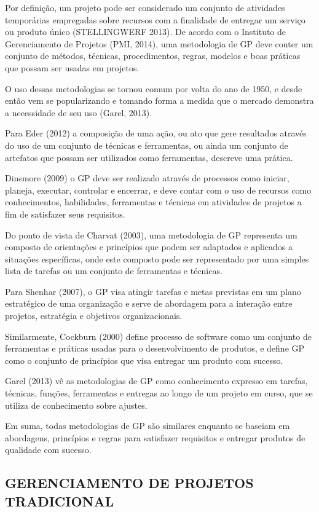 Por definição, um projeto pode ser considerado um conjunto de atividades temporárias empregadas sobre recursos com a finalidade de entregar um serviço ou produto único (STELLINGWERF 2013). De acordo com o Instituto de Gerenciamento de Projetos (PMI, 2014), uma metodologia de GP deve conter um conjunto de métodos, técnicas, procedimentos, regras, modelos e boas práticas que possam ser usadas em projetos.

O uso dessas metodologias se tornou comum por volta do ano de 1950, e desde então vem se popularizando e tomando forma a medida que o mercado demonstra a necessidade de seu uso (Garel, 2013).

Para Eder (2012) a composição de uma ação, ou ato que gere resultados através do uso de um conjunto de técnicas e ferramentas, ou ainda um conjunto de artefatos que possam ser utilizados como ferramentas, descreve uma prática.

Dinsmore (2009) o GP deve ser realizado através de processos como iniciar, planeja, executar, controlar e encerrar, e deve contar com o uso de recursos como conhecimentos, habilidades, ferramentas e técnicas em atividades de projetos a fim de satisfazer seus requisitos.

Do ponto de vista de Charvat (2003), uma metodologia de GP representa um composto de orientações e princípios que podem ser adaptados e aplicados a situações específicas, onde este composto pode ser representado por uma simples lista de tarefas ou um conjunto de ferramentas e técnicas.

Para Shenhar (2007), o GP visa atingir tarefas e metas previstas em um plano estratégico de uma organização e serve de abordagem para a interação entre projetos, estratégia e objetivos organizacionais.

Similarmente, Cockburn (2000) define processo de software como um conjunto de ferramentas e práticas usadas para o desenvolvimento de produtos, e define GP como o conjunto de princípios que visa entregar um produto com sucesso.

Garel (2013) vê as metodologias de GP como conhecimento expresso em tarefas, técnicas, funções, ferramentas e entregas ao longo de um projeto em curso, que se utiliza de conhecimento sobre ajustes.

Em suma, todas metodologias de GP são similares enquanto se baseiam em abordagens, princípios e regras para satisfazer requisitos e entregar produtos de qualidade com sucesso.


\subsection{GERENCIAMENTO DE PROJETOS TRADICIONAL}


